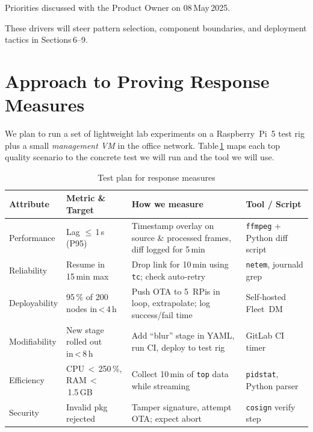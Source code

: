 \documentclass[11pt,a4paper]{article}
\begin{document}
\vspace{0.3em}
\noindent *Priorities discussed with the Product Owner on 08 May 2025.

These drivers will steer pattern selection, component boundaries, and deployment tactics in Sections 6–9.

\section{Approach to Proving Response Measures}

We plan to run a set of lightweight lab experiments on a Raspberry Pi 5 test rig plus a small \textit{management VM} in the office network.  
Table \ref{tab:testplan} maps each top quality scenario to the concrete test we will run and the tool we will use.

\begin{table}[h!]
\centering
\setlength{\extrarowheight}{2pt}
\begin{tabular}{|p{2.6cm}|p{4.2cm}|p{4.0cm}|p{3.1cm}|}
\hline
\textbf{Attribute} & \textbf{Metric \& Target} & \textbf{How we measure} & \textbf{Tool / Script} \\ \hline
Performance & Lag $\le$ 1 s (P95) & Timestamp overlay on source \& processed frames, diff logged for 5 min & \texttt{ffmpeg} + Python diff script \\ \hline
Reliability & Resume in 15 min max & Drop link for 10 min using \texttt{tc}; check auto‑retry & \texttt{netem}, journald grep \\ \hline
Deployability & 95 \% of 200 nodes in < 4 h & Push OTA to 5 RPis in loop, extrapolate; log success/fail time & Self‑hosted Fleet DM \\ \hline
Modifiability & New stage rolled out in < 8 h & Add “blur” stage in YAML, run CI, deploy to test rig & GitLab CI timer \\ \hline
Efficiency & CPU $<$ 250 \%, RAM $<$ 1.5 GB & Collect 10 min of \texttt{top} data while streaming & \texttt{pidstat}, Python parser \\ \hline
Security & Invalid pkg rejected & Tamper signature, attempt OTA; expect abort & \texttt{cosign} verify step \\ \hline
\end{tabular}
\caption{Test plan for response measures}
\label{tab:testplan}
\end{table}
\end{document}
